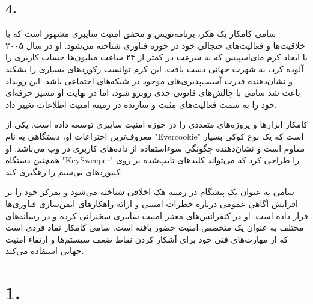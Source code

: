 \subsection*{4. }

سامی کامکار یک هکر، برنامه‌نویس و محقق امنیت سایبری مشهور است که با خلاقیت‌ها و فعالیت‌های جنجالی خود در حوزه فناوری شناخته می‌شود. او در سال ۲۰۰۵ با ایجاد کرم مای‌اسپیس که به سرعت در کمتر از ۲۴ ساعت میلیون‌ها حساب کاربری را آلوده کرد، به شهرت جهانی دست یافت. این کرم توانست رکوردهای بسیاری را بشکند و نشان‌دهنده قدرت آسیب‌پذیری‌های موجود در شبکه‌های اجتماعی باشد. این رویداد باعث شد سامی با چالش‌های قانونی جدی روبرو شود، اما در نهایت او مسیر حرفه‌ای خود را به سمت فعالیت‌های مثبت و سازنده در زمینه امنیت اطلاعات تغییر داد.

کامکار ابزارها و پروژه‌های متعددی را در حوزه امنیت سایبری توسعه داده است. یکی از معروف‌ترین اختراعات او، دستگاهی به نام "Evercookie" است که یک نوع کوکی بسیار مقاوم است و نشان‌دهنده چگونگی سوءاستفاده از داده‌های کاربری در وب می‌باشد. او همچنین دستگاه "KeySweeper" را طراحی کرد که می‌تواند کلیدهای تایپ‌شده بر روی کیبوردهای بی‌سیم را رهگیری کند.

سامی به عنوان یک پیشگام در زمینه هک اخلاقی شناخته می‌شود و تمرکز خود را بر افزایش آگاهی عمومی درباره خطرات امنیتی و ارائه راهکارهای ایمن‌سازی فناوری‌ها قرار داده است. او در کنفرانس‌های معتبر امنیت سایبری سخنرانی کرده و در رسانه‌های مختلف به عنوان یک متخصص امنیت حضور یافته است. سامی کامکار نماد فردی است که از مهارت‌های فنی خود برای آشکار کردن نقاط ضعف سیستم‌ها و ارتقاء امنیت جهانی استفاده می‌کند.

\newpage
\section*{1. }

